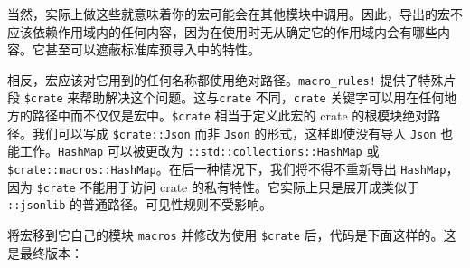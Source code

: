 当然，实际上做这些就意味着你的宏可能会在其他模块中调用。因此，导出的宏不应该依赖作用域内的任何内容，因为在使用时无从确定它的作用域内会有哪些内容。它甚至可以遮蔽标准库预导入中的特性。

相反，宏应该对它用到的任何名称都使用绝对路径。\texttt{macro\_rules!} 提供了特殊片段 \texttt{\$crate} 来帮助解决这个问题。这与\texttt{crate} 不同，\texttt{crate} 关键字可以用在任何地方的路径中而不仅仅是宏中。\texttt{\$crate} 相当于定义此宏的 crate 的根模块绝对路径。我们可以写成 \texttt{\$crate::Json} 而非 \texttt{Json} 的形式，这样即使没有导入 \texttt{Json} 也能工作。\texttt{HashMap} 可以被更改为 \texttt{::std::collections::HashMap} 或 \texttt{\$crate::macros::HashMap}。在后一种情况下，我们将不得不重新导出 \texttt{HashMap}，因为 \texttt{\$crate} 不能用于访问 crate 的私有特性。它实际上只是展开成类似于 \texttt{::jsonlib} 的普通路径。可见性规则不受影响。

将宏移到它自己的模块 \texttt{macros} 并修改为使用 \texttt{\$crate} 后，代码是下面这样的。这是最终版本：

